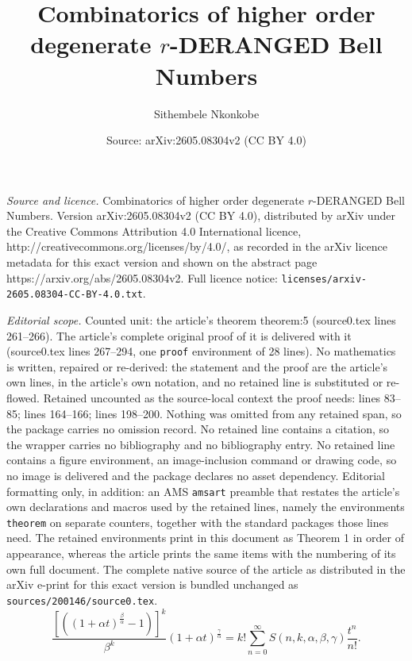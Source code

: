\documentclass[10pt,a4paper]{amsart}
\title{Combinatorics of higher order degenerate $r$-DERANGED Bell Numbers}
\author{Sithembele Nkonkobe}
\date{Source: arXiv:2605.08304v2 (CC BY 4.0)}
\begin{document}
\maketitle

\noindent\emph{Source and licence.} Combinatorics of higher order degenerate $r$-DERANGED Bell Numbers. Version arXiv:2605.08304v2 (CC BY 4.0), distributed by arXiv under the Creative Commons Attribution 4.0 International licence, http://creativecommons.org/licenses/by/4.0/, as recorded in the arXiv licence metadata for this exact version and shown on the abstract page https://arxiv.org/abs/2605.08304v2. Full licence notice: \texttt{licenses/arxiv-2605.08304-CC-BY-4.0.txt}.\par\smallskip

\noindent\textit{Editorial scope.} Counted unit: the article's theorem theorem:5 (source0.tex lines 261--266). The article's complete original proof of it is delivered with it (source0.tex lines 267--294, one \texttt{proof} environment of 28 lines). No mathematics is written, repaired or re-derived: the statement and the proof are the article's own lines, in the article's own notation, and no retained line is substituted or re-flowed.  Retained uncounted as the source-local context the proof needs: lines 83--85; lines 164--166; lines 198--200.  Nothing was omitted from any retained span, so the package carries no omission record.  No retained line contains a citation, so the wrapper carries no bibliography and no bibliography entry.  No retained line contains a figure environment, an image-inclusion command or drawing code, so no image is delivered and the package declares no asset dependency.  Editorial formatting only, in addition: an AMS \texttt{amsart} preamble that restates the article's own declarations and macros used by the retained lines, namely the environments \texttt{theorem} on separate counters, together with the standard packages those lines need.  The retained environments print in this document as Theorem 1 in order of appearance, whereas the article prints the same items with the numbering of its own full document.  The complete native source of the article as distributed in the arXiv e-print for this exact version is bundled unchanged as \texttt{sources/200146/source0.tex}.
\begin{equation}\label{equation:3}
	\frac{[((1+\alpha t)^\frac{\beta}{\alpha}-1)]^k}{\beta^k}(1+\alpha t)^{\frac{\gamma}{\alpha}}=k!\sum\limits_{n=0}^{\infty}S(n,k,\alpha,\beta,\gamma)\frac{t^n}{n!}.
\end{equation}
\end{document}
